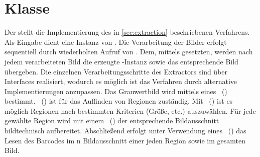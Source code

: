 \section{Klasse }
Der  stellt die Implementierung des in \autoref{sec:extraction} beschriebenen Verfahrens.
Als Eingabe dient eine Instanz von .
Die Verarbeitung der Bilder erfolgt sequentiell durch wiederholten Aufruf von .
Dem, mittels  gesetzten,  werden nach jedem verarbeiteten Bild die erzeugte -Instanz sowie das entsprechende Bild übergeben.
\noindent
Die einzelnen Verarbeitungsschritte des Extractors sind über Interfaces realisiert, wodurch es möglich ist das Verfahren durch alternative Implementierungen anzupassen.
Das Grauwertbild wird mittels eines ~() bestimmt.
~() ist für das Auffinden von Regionen zuständig.
Mit ~() ist es möglich Regionen nach bestimmten Kriterien (Größe, etc.) auszuwählen.
Für jede gewählte Region wird mit einem ~() der entsprechende Bildausschnitt bildtechnisch aufbereitet.
Abschließend erfolgt unter Verwendung eines ~() das Lesen des Barcodes im n Bildausschnitt einer jeden Region sowie im gesamten Bild.


